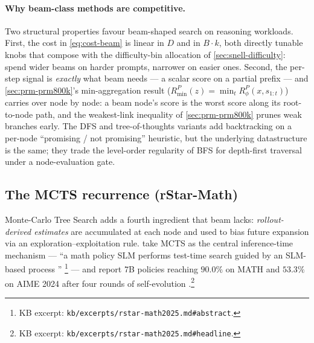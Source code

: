 \paragraph{Why beam-class methods are competitive.} Two structural
properties favour beam-shaped search on reasoning workloads. First,
the cost in \cref{eq:cost-beam} is linear in $D$ and in $B \cdot k$,
both directly tunable knobs that compose with the difficulty-bin
allocation of \cref{sec:snell-difficulty}: spend wider beams on harder
prompts, narrower on easier ones. Second, the per-step  signal is
\emph{exactly} what beam needs --- a scalar score on a partial prefix
--- and \cref{sec:prm-prm800k}'s min-aggregation result
($R^P_\text{min}(z) = \min_t R^P_\phi(x, s_{1:t})$) carries over node
by node: a beam node's score is the worst  score along its
root-to-node path, and the weakest-link inequality of
\cref{sec:prm-prm800k} prunes weak branches early. The DFS and
tree-of-thoughts variants
add backtracking on a per-node ``promising / not promising''
heuristic, but the underlying datastructure is the same; they trade
the level-order regularity of BFS for depth-first traversal under a
node-evaluation gate.

\subsection{The MCTS recurrence (rStar-Math)}
\label{sec:tree-mcts}

Monte-Carlo Tree Search adds a fourth ingredient that beam lacks:
\emph{rollout-derived  estimates} are accumulated at each node and
used to bias future expansion via an exploration--exploitation rule.
\citet{rstar-math2025} take MCTS as the central inference-time
mechanism --- ``a math policy SLM performs test-time search guided by
an SLM-based process ''
\citep[abstract]{rstar-math2025}\footnote{KB excerpt:
\nolinkurl{kb/excerpts/rstar-math2025.md#abstract}.} --- and report 7B
policies reaching $90.0\%$ on MATH and $53.3\%$ on AIME 2024 after
four rounds of self-evolution
\citep[headline numbers]{rstar-math2025}.\footnote{KB excerpt:
\nolinkurl{kb/excerpts/rstar-math2025.md#headline}.}

